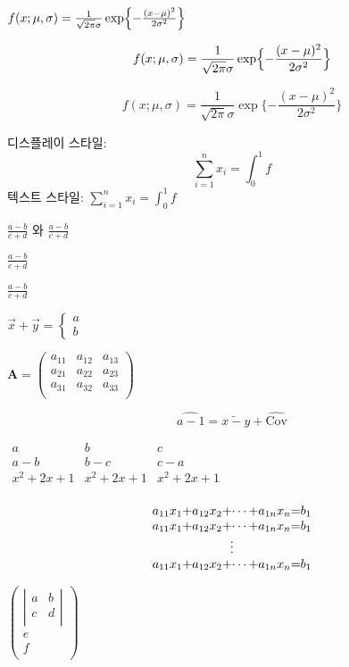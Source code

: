 \documentclass[11pt]{article}
\begin{document}
$f(x;\mu,\sigma) = \frac{1}{\sqrt{2\pi}\sigma} \exp \Bigl\{-\frac{(x-\mu)^2}{2\sigma^2} \Bigr\}$

\[
f(x;\mu,\sigma) = \frac{1}{\sqrt{2\pi}\sigma} \exp \Bigl\{-\frac{(x-\mu)^2}{2\sigma^2} \Bigr\}
\]

\[
f(x;\mu,\sigma) = \frac{1}{\sqrt{2\pi}\sigma} \exp \{-\frac{(x-\mu)^2}{2\sigma^2} \}
\]

디스플레이 스타일:
\[\sum_{i=1}^n x_i = \int_0^1 f \]
텍스트 스타일:
$\sum_{i=1}^n x_i = \int_0^1 f$

$\displaystyle \frac{a-b}{c+d}$ 와 $\frac{a-b}{c+d}$

$\displaystyle{\frac{a-b}{c+d}}$

$\frac{\displaystyle a-b}{\displaystyle c+d}$

$\vec{x} + \vec{y} = \left \{ 
\begin{array}{l} a \\ b \end{array}
\right.$

$\textbf{A} = \left( 
\begin{array}{ccc} 
a_{11}& a_{12} & a_{13} \\
a_{21}& a_{22}& a_{23} \\
a_{31}& a_{32}& a_{33} \\
\end{array} 
\right)$

$$\widehat{a-1} = \widetilde{x-y} + \widehat{\mbox{Cov}}$$

$\begin{array}{lrc}
a & b & c\\
a-b & b-c & c-a \\
x^2+2x+1 & x^2+2x+1 & x^2+2x+1 \\
\end{array}$

\begin{equation}
\begin{array}{*{3}{c@{+}}c@{=}c}
a_{11}x_1 & a_{12}x_2 & \cdots & a_{1n}x_n & b_1 \\
a_{11}x_1 & a_{12}x_2 & \cdots & a_{1n}x_n & b_1 \\
\multicolumn{5}{c}{\vdots} \\
a_{11}x_1 & a_{12}x_2 & \cdots & a_{1n}x_n & b_1 \\
\end{array}
\end{equation}

$\left( 
\begin{array}{c}
\left| 
\begin{array}{cc}
a & b \\
c & d \\
\end{array} 
\right| \\
e \\ 
f \\
\end{array} 
\right)$
\end{document}
